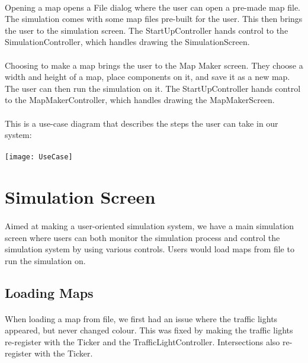 \documentclass[a4paper,11pt,titlepage]{article}
\begin{document}
\paragraph{}
Opening a map opens a File dialog where the user can open a pre-made map file. The simulation comes with some map files pre-built for the user. This then brings the user to the simulation screen. The StartUpController hands control to the SimulationController, which handles drawing the SimulationScreen. 
\paragraph{}
Choosing to make a map brings the user to the Map Maker screen. They choose a width and height of a map, place components on it, and save it as a new map. The user can then run the simulation on it. The StartUpController hands control to the MapMakerController, which handles drawing the MapMakerScreen.
\paragraph{}
This is a use-case diagram that describes the steps the user can take in our system:
\paragraph{}
\centerline{ \texttt{[image: UseCase]}}

\section{Simulation Screen}
\paragraph{}
Aimed at making a user-oriented simulation system, we have a main simulation screen where users can both monitor the simulation process and control the simulation system by using various controls. Users would load maps from file to run the simulation on.
\subsection{Loading Maps}
\paragraph{}
When loading a map from file, we first had an issue where the traffic lights appeared, but never changed colour. This was fixed by making the traffic lights re-register with the Ticker and the TrafficLightController. Intersections also re-register with the Ticker.
\end{document}
